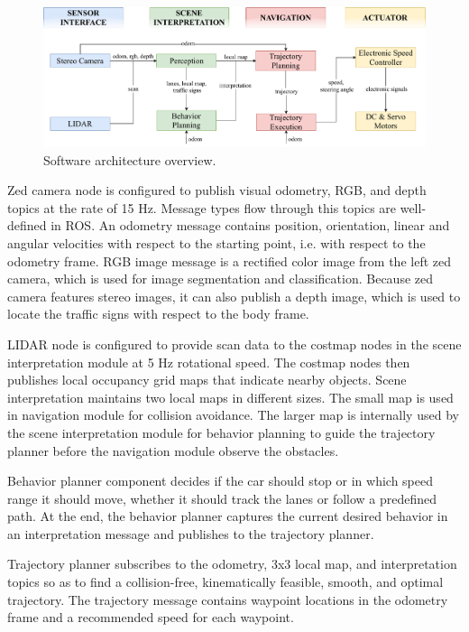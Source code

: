 \begin{figure}[h]
  \centering
  \includegraphics[width=.9\textwidth]{figures/software-architecture.pdf}
  \caption[Software architecture overview]{Software architecture overview.}
  \label{figure:software-architecture}
\end{figure}

Zed camera node is configured to publish visual odometry, RGB, and depth topics
at the rate of 15 Hz. Message types flow through this topics are well-defined
in ROS. An odometry message contains position, orientation, linear and angular
velocities with respect to the starting point, i.e. with respect to the
odometry frame. RGB image message is a rectified color image from the left zed
camera, which is used for image segmentation and classification. Because zed
camera features stereo images, it can also publish a depth image, which is used
to locate the traffic signs with respect to the body frame.

LIDAR node is configured to provide scan data to the costmap nodes in the scene
interpretation module at 5 Hz rotational speed. The costmap nodes then
publishes local occupancy grid maps that indicate nearby objects. Scene
interpretation maintains two local maps in different sizes. The small map is
used in navigation module for collision avoidance.  The larger map is
internally used by the scene interpretation module for behavior planning to
guide the trajectory planner before the navigation module observe the
obstacles.

Behavior planner component decides if the car should stop or in which speed
range it should move, whether it should track the lanes or follow a predefined
path. At the end, the behavior planner captures the current desired
behavior in an interpretation message and publishes to the trajectory planner.

Trajectory planner subscribes to the odometry, 3x3 local map, and
interpretation topics so as to find a collision-free, kinematically feasible,
smooth, and optimal trajectory. The trajectory message contains waypoint
locations in the odometry frame and a recommended speed for each waypoint.

